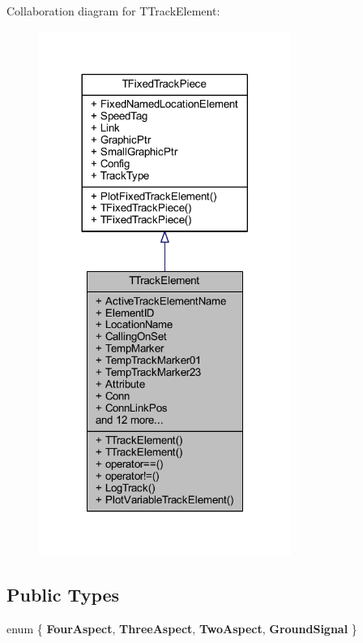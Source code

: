 Collaboration diagram for T\+Track\+Element\+:
\nopagebreak
\begin{figure}[H]
\begin{center}
\leavevmode
\includegraphics[width=233pt]{class_t_track_element__coll__graph}
\end{center}
\end{figure}
\subsection*{Public Types}
\begin{DoxyCompactItemize}
\item 
\mbox{\label{class_t_track_element_abbbcaeb3e062e962d53337965d4fcaad}} 
enum \{ {\bfseries Four\+Aspect}, 
{\bfseries Three\+Aspect}, 
{\bfseries Two\+Aspect}, 
{\bfseries Ground\+Signal}
 \}
\end{DoxyCompactItemize}
